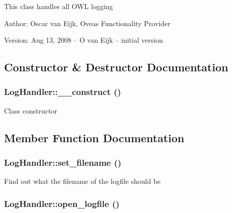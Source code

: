 This class handles all OWL logging \begin{Desc}
\item[Author:]Oscar van Eijk, Oveas Functionality Provider \end{Desc}
\begin{Desc}
\item[Version:]Aug 13, 2008 -- O van Eijk -- initial version \end{Desc}


\subsection{Constructor \& Destructor Documentation}
\hypertarget{classLogHandler_acca49c4394109f4ccc494048a0b2cab}{
\subsubsection{\setlength{\rightskip}{0pt plus 5cm}LogHandler::\_\-\_\-construct ()}}
\label{classLogHandler_acca49c4394109f4ccc494048a0b2cab}


Class constructor 

\subsection{Member Function Documentation}
\hypertarget{classLogHandler_65ef4f1c6ab4cff4057f5f5932cc690e}{
\subsubsection{\setlength{\rightskip}{0pt plus 5cm}LogHandler::set\_\-filename ()}}
\label{classLogHandler_65ef4f1c6ab4cff4057f5f5932cc690e}


Find out what the filename of the logfile should be \hypertarget{classLogHandler_af324e5156bf8ea83e5b4e990ea99e2d}{
\subsubsection{\setlength{\rightskip}{0pt plus 5cm}LogHandler::open\_\-logfile ()}}
\label{classLogHandler_af324e5156bf8ea83e5b4e990ea99e2d}


